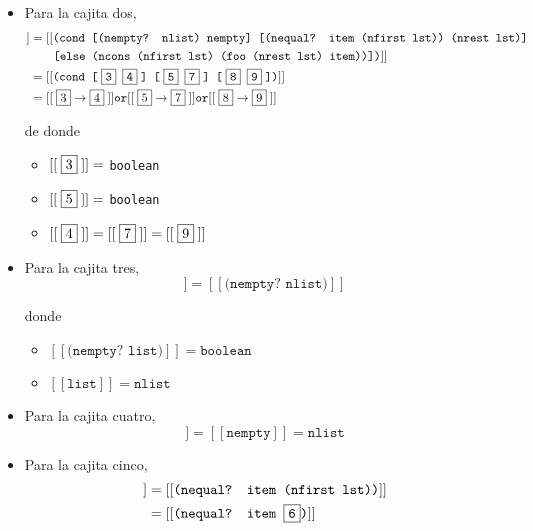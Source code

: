 \documentclass[letterpaper,11pt]{article}
\begin{document}
\begin{enumerate}
\begin{itemize}
        \item Para la cajita dos, 
        \begin{align*}
            [[\;\fbox{2}\;]] 
            &= [[\texttt{(cond [(nempty? nlist) nempty] [(nequal? item 
            (nfirst lst)) (nrest lst)]} \\ 
            &\; \; \; \; \; \; \; \texttt{[else (ncons (nfirst lst) 
            (foo (nrest lst) item))])}]] \\ 
            &= [[\texttt{(cond [\;\fbox{3} \fbox{4}\;] [\;\fbox{5} \fbox{7}\;] 
            [\;\fbox{8} \fbox{9}\;])}]] \\
            &= [[\;\fbox{3} \rightarrow \fbox{4}\;]] \texttt{or} 
            [[\;\fbox{5} \rightarrow \fbox{7}\;]] \texttt{or}
            [[\;\fbox{8} \rightarrow \fbox{9}\;]]
        \end{align*}

        de donde 
        \begin{itemize}
            \item $[[\;\fbox{3}\;]] =$ \texttt{boolean}
            \item $[[\;\fbox{5}\;]] =$ \texttt{boolean}
            \item $[[\;\fbox{4}\;]] = [[\;\fbox{7}\;]] = [[\;\fbox{9}\;]]$
        \end{itemize}

        \item Para la cajita tres, 
        \begin{equation*}
            [[\;\fbox{3}\;]] = [[\texttt{(nempty? nlist)}]]
        \end{equation*}

        donde 
        \begin{itemize}
            \item $[[\texttt{(nempty? list)}]] = \texttt{boolean}$
            \item $[[\texttt{list}]] = \texttt{nlist}$
        \end{itemize}

        \item Para la cajita cuatro, 
        \begin{equation*}
            [[\;\fbox{4}\;]] = [[\texttt{nempty}]] = \texttt{nlist}
        \end{equation*}

        \item Para la cajita cinco,
        \begin{align*}
            [[\;\fbox{5}\;]]
            &= [[\texttt{(nequal? item (nfirst lst))}]] \\ 
            &= [[\texttt{(nequal? item \fbox{6})}]] 
        \end{align*}


\end{itemize}
\end{enumerate}
\end{document}
